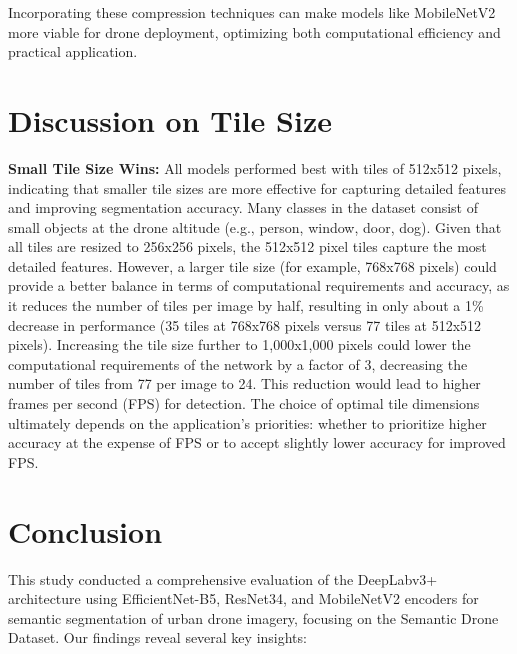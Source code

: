 \documentclass[a4paper]{article}
\begin{document}
Incorporating these compression techniques can make models like MobileNetV2 more viable for drone deployment, optimizing both computational efficiency and practical application.

\section{Discussion on Tile Size}
\textbf{Small Tile Size Wins: }All models performed best with tiles of 512x512 pixels, indicating that smaller tile sizes are more effective for capturing detailed features and improving segmentation accuracy. Many classes in the dataset consist of small objects at the drone altitude (e.g., person, window, door, dog). Given that all tiles are resized to 256x256 pixels, the 512x512 pixel tiles capture the most detailed features. However, a larger tile size (for example, 768x768 pixels) could provide a better balance in terms of computational requirements and accuracy, as it reduces the number of tiles per image by half, resulting in only about a 1\% decrease in performance (35 tiles at 768x768 pixels versus 77 tiles at 512x512 pixels). Increasing the tile size further to 1,000x1,000 pixels could lower the computational requirements of the network by a factor of 3, decreasing the number of tiles from 77 per image to 24. This reduction would lead to higher frames per second (FPS) for detection. The choice of optimal tile dimensions ultimately depends on the application's priorities: whether to prioritize higher accuracy at the expense of FPS or to accept slightly lower accuracy for improved FPS.

\section{Conclusion}
This study conducted a comprehensive evaluation of the DeepLabv3+ architecture using EfficientNet-B5, ResNet34, and MobileNetV2 encoders for semantic segmentation of urban drone imagery, focusing on the Semantic Drone Dataset. Our findings reveal several key insights:
\end{document}
